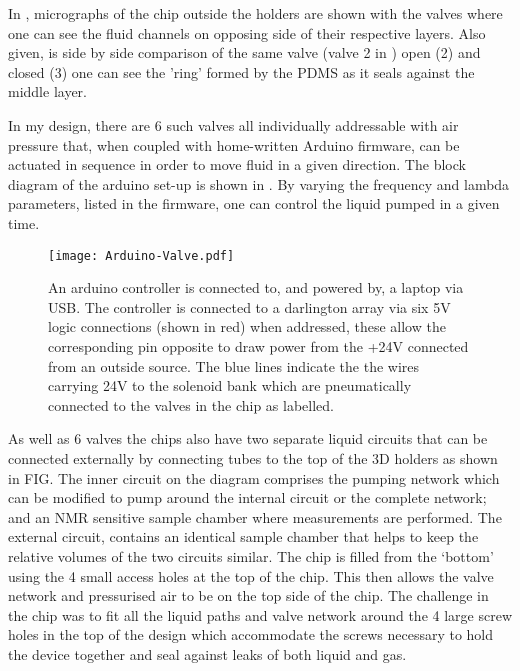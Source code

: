 In , micrographs of the chip outside the holders are shown with the valves where one can see the fluid channels on opposing side of their respective layers. Also given, is side by side comparison of the same valve (valve 2 in ) open (2) and closed (3) one can see the 'ring' formed by the PDMS as it seals against the middle layer.

In my design, there are 6 such valves all individually addressable with air pressure that, when
coupled with home-written Arduino firmware, can be actuated in sequence in order to move
fluid in a given direction. The block diagram of the arduino set-up is shown in
. By varying the frequency and lambda parameters, listed in the
firmware, one can control the liquid pumped in a given time.

\begin{figure}
  \begin{center}
  \texttt{[image: Arduino-Valve.pdf]}
  \end{center}
  \caption{An arduino controller is connected to, and powered by, a laptop via USB. The controller is connected
  to a darlington array via six 5V logic connections (shown in red) when addressed, these allow the corresponding pin
  opposite to draw power from the +24V connected from an outside source. The blue lines indicate the the wires
  carrying 24V to the solenoid bank which are pneumatically connected to the valves in the chip as labelled. }
  \label{fig:ValveSetup}
\end{figure}

As well as 6 valves the chips also have two separate liquid
circuits that can be connected externally by connecting tubes to the top of the 3D
holders as shown in FIG. The inner circuit on
the diagram comprises the pumping network which can be
modified to pump around the internal circuit or the complete network; and an NMR
sensitive sample chamber where measurements are performed. The external circuit,
contains an identical sample chamber that helps to keep the relative
volumes of the two circuits similar. The chip is filled from the
‘bottom’ using the 4 small access holes at the top of the chip.
This then allows the valve network and pressurised air to be
on the top side of the chip. The challenge in the chip was to fit
all the liquid paths and valve network around the 4 large screw
holes in the top of the design which accommodate the screws
necessary to hold the device together and seal against leaks of
both liquid and gas.


